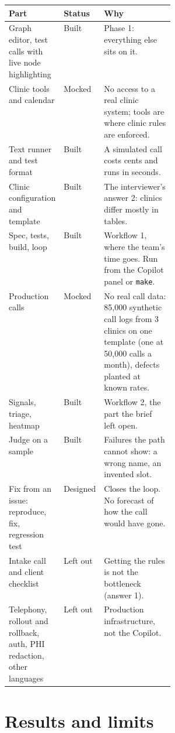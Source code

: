 \documentclass[11pt,a4paper]{article}
\newcommand{\code}[1]{\texttt{\small #1}}
\begin{document}
\begin{center}\small
\begin{tabularx}{\linewidth}{@{}>{\raggedright}p{0.33\linewidth} l X@{}}
\toprule
\textbf{Part} & \textbf{Status} & \textbf{Why} \\
\midrule
Graph editor, test calls with live node highlighting & Built & Phase 1: everything else sits on it. \\
Clinic tools and calendar & Mocked & No access to a real clinic system; tools are where clinic rules are enforced. \\
Text runner and test format & Built & A simulated call costs cents and runs in seconds. \\
Clinic configuration and template & Built & The interviewer's answer 2: clinics differ mostly in tables. \\
Spec, tests, build, loop & Built & Workflow 1, where the team's time goes. Run from the Copilot panel or \code{make}. \\
Production calls & Mocked & No real call data: 85,000 synthetic call logs from 3 clinics on one template (one at 50,000 calls a month), defects planted at known rates. \\
Signals, triage, heatmap & Built & Workflow 2, the part the brief left open. \\
Judge on a sample & Built & Failures the path cannot show: a wrong name, an invented slot. \\
Fix from an issue: reproduce, fix, regression test & Designed & Closes the loop. No forecast of how the call would have gone. \\
Intake call and client checklist & Left out & Getting the rules is not the bottleneck (answer 1). \\
Telephony, rollout and rollback, auth, PHI redaction, other languages & Left out & Production infrastructure, not the Copilot. \\
\bottomrule
\end{tabularx}
\end{center}

\section{Results and limits}
\end{document}
